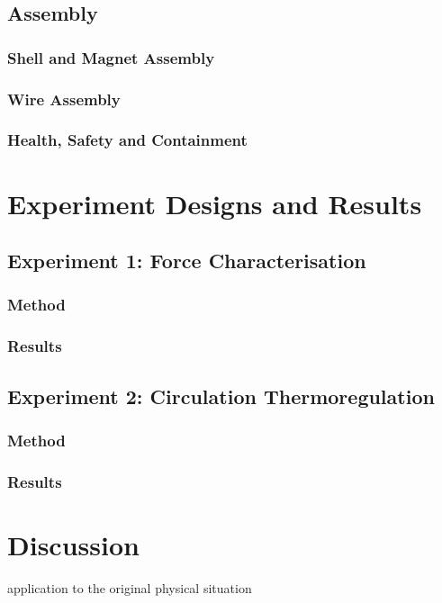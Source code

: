 \documentclass[a4paper]{article}
\begin{document}
\subsection{Assembly}
\subsubsection{Shell and Magnet Assembly}
\subsubsection{Wire Assembly}
\subsubsection{Health, Safety and Containment}

\newpage

\section{Experiment Designs and Results}
\subsection{Experiment 1: Force Characterisation}
\subsubsection{Method}
\subsubsection{Results}
\subsection{Experiment 2: Circulation Thermoregulation}
\subsubsection{Method}
\subsubsection{Results}

\newpage

\section{Discussion}

application to the original physical situation\\ 
\end{document}
